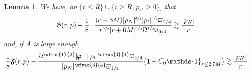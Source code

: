 \documentclass[JEP,XML,SOM,Unicode,published]{cedram}
\theoremstyle{plain}
\newtheorem{lemma}[proposition]{Lemma}
\theoremstyle{definition}
\begin{document}
\begin{lemma}\label{LemtechniCompu}
We have, on $\{ r \leq R\} \cup \{ r \geq R, \, p_{r^*} \geq 0 \}$, that\vspace*{-3pt}
\begin{equation*}
\mathfrak{G}(r,p)- \frac{1}{8} \cdot \frac{(r+3M)|p_N|^{\sfrac{3}{4}} |p_t|^{\sfrac{1}{4}}\overline{\omega}_{1/4} }{r^{\sfrac{5}{2}}|r+6M|^{\sfrac{3}{2}}\Omega^{\sfrac{1}{2}} \overline{\omega}_{9/4}} \gtrsim \frac{|p_N|}{r}.
\end{equation*}
and, if $A$ is large enough,\vspace*{-3pt}
\begin{equation*}
\frac{1}{8}\mathfrak{F}(r,p)- \frac{ \Omega^{\sfrac{1}{2}}|\pmb{\varphi}_-||p_t|^{\sfrac{3}{4}}\overline{\omega}_{9/4}}{ |p_N|^{\sfrac{3}{4}}\overline{\omega}_{1/4}}\bigl(1+ C_0 \mathds{1}_{r \leq 2.7M} \bigr) \gtrsim \frac{|p_N|}{r}
\end{equation*}
\end{lemma}
\end{document}
